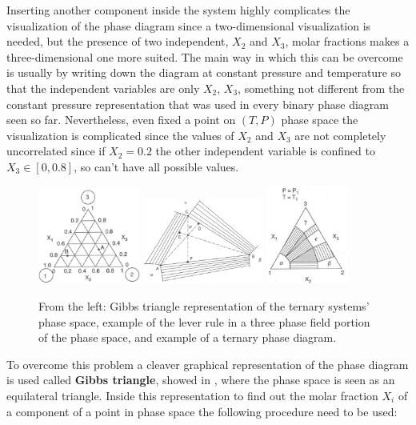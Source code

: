 Inserting another component inside the system highly complicates the visualization of the phase diagram since a two-dimensional visualization is needed, but the presence of two independent, $X_2$ and $X_3$,  molar fractions makes a three-dimensional one more suited. The main way in which this can be overcome is usually by writing down the diagram at constant pressure and temperature so that the independent variables are only $X_2$, $X_3$, something not different from the constant pressure representation that was used in every binary phase diagram seen so far. Nevertheless, even fixed a point on $(T,P)$ phase space the visualization is complicated since the values of $X_2$ and $X_3$ are not completely uncorrelated since if $X_2 = 0.2$ the other independent variable is confined to $X_3 \in [0, 0.8]$, so can't have all possible values.
\begin{figure}[b]
    \centering
    \includegraphics[width=0.3\textwidth]{Immagini/GibbsTriangle.png}
    \includegraphics[width=0.35\textwidth]{Immagini/LeverRule.png}
    \includegraphics[width=0.24\textwidth]{Immagini/TernPD.png}
    \caption
    {
        From the left: Gibbs triangle representation of the ternary systems' phase space, example of the lever rule in a three phase field portion of the phase space, and example of a ternary phase diagram.
    }
    \label{fig:TernaryPD}
\end{figure}
To overcome this problem a cleaver graphical representation of the phase diagram is used called \textbf{Gibbs triangle}, showed in , where the phase space is seen as an equilateral triangle. Inside this representation to find out the molar fraction $X_i$ of a component of a point in phase space the following procedure need to be used:

